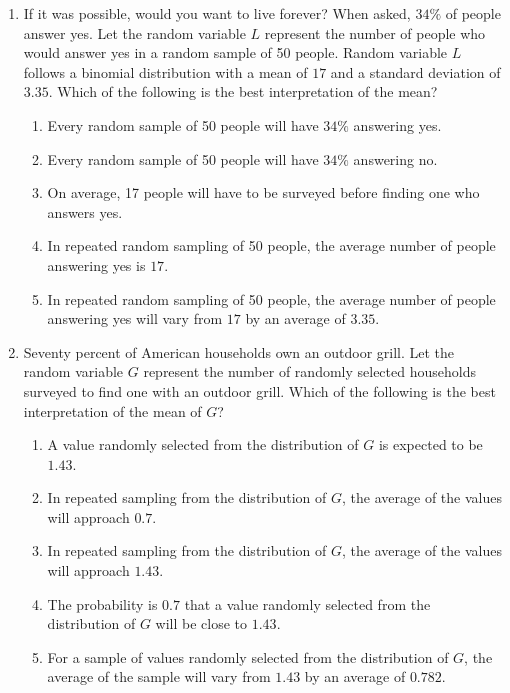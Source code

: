 \documentclass{article}
\begin{document}
\begin{enumerate}[label=\textbf{S\arabic*.}]
\item If it was possible, would you want to live forever? When asked, $34\%$ of people answer yes. Let the random variable $L$ represent the number of people who would answer yes in a random sample of 50 people. Random variable $L$ follows a binomial distribution with a mean of $17$ and a standard deviation of $3.35$. Which of the following is the best interpretation of the mean? 

\begin{enumerate}
  \item Every random sample of 50 people will have $34\%$ answering yes.
  \item Every random sample of 50 people will have $34\%$ answering no.
  \item On average, 17 people will have to be surveyed before finding one who answers yes.
  \item In repeated random sampling of 50 people, the average number of people answering yes is $17$.
  \item In repeated random sampling of 50 people, the average number of people answering yes will vary from $17$ by an average of $3.35$.
\end{enumerate}

\item Seventy percent of American households own an outdoor grill. Let the random variable $G$ represent the number of randomly selected households surveyed to find one with an outdoor grill. Which of the following is the best interpretation of the mean of $G$? 

\begin{enumerate}
  \item A value randomly selected from the distribution of $G$ is expected to be $1.43$.
  \item In repeated sampling from the distribution of $G$, the average of the values will approach $0.7$.
  \item In repeated sampling from the distribution of $G$, the average of the values will approach $1.43$.
  \item The probability is $0.7$ that a value randomly selected from the distribution of $G$ will be close to $1.43$.
  \item For a sample of values randomly selected from the distribution of $G$, the average of the sample will vary from $1.43$ by an average of $0.782$.
\end{enumerate}



\end{enumerate}
\end{document}
